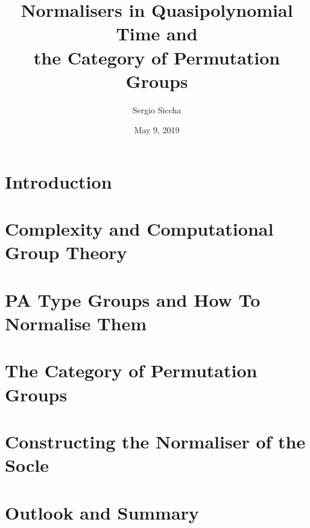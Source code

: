 \documentclass{beamer}
\title{Normalisers in Quasipolynomial Time and \\
the Category of Permutation Groups}
\date{May 9, 2019}
\author{Sergio Siccha}
\institute{Lehr- und Forschungsgebiet Algebra, RWTH Aachen}
\theoremstyle{plain}
\theoremstyle{definition}
\begin{document}
\maketitle
{}

\section{Introduction}


\section{Complexity and Computational Group Theory}


\section{PA Type Groups and How To Normalise Them}


\section{The Category of Permutation Groups}


\section{Constructing the Normaliser of the Socle}


\section{Outlook and Summary}


\appendix

\end{document}
